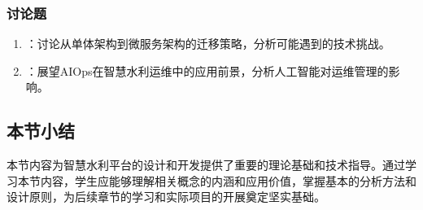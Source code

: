\hypertarget{ux8ba8ux8bbaux9898-3}{%
\subsubsection{讨论题}\label{ux8ba8ux8bbaux9898-3}}

\begin{enumerate}
\def\labelenumi{\arabic{enumi}.}
\tightlist
\item
  ：讨论从单体架构到微服务架构的迁移策略，分析可能遇到的技术挑战。
\item
  ：展望AIOps在智慧水利运维中的应用前景，分析人工智能对运维管理的影响。
\end{enumerate}

\hypertarget{ux672cux8282ux5c0fux7ed3-3}{%
\subsection{本节小结}\label{ux672cux8282ux5c0fux7ed3-3}}

本节内容为智慧水利平台的设计和开发提供了重要的理论基础和技术指导。通过学习本节内容，学生应能够理解相关概念的内涵和应用价值，掌握基本的分析方法和设计原则，为后续章节的学习和实际项目的开展奠定坚实基础。